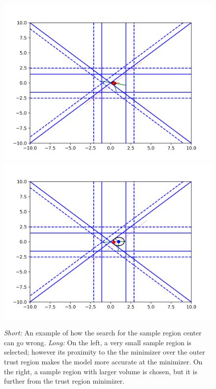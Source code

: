 \begin{figure}[ht]
    \centering
    \includegraphics[scale=0.4]{images/everything_runs_1.png}
    \includegraphics[scale=0.4]{images/everything_runs_2.png}
    \caption{
    	\emph{Short:} An example of how the search for the sample region center can go wrong.
    	\emph{Long:} On the left, a very small sample region is selected; however its proximity to the the minimizer over the outer trust region makes the model more accurate at the minimizer.
    	On the right, a sample region with larger volume is chosen, but it is further from the trust region minimizer.
	}
    \label{ellipse_runs_away}
\end{figure}


